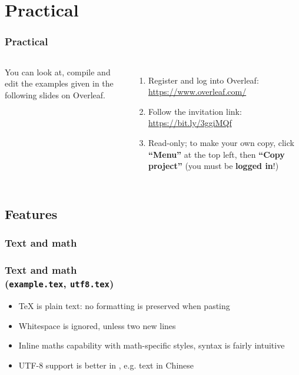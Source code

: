 \documentclass[xetex,colorlinks]{beamer} %
\begin{document}
  \section{Practical}
  \begin{frame}
    \frametitle{Practical}
    \begin{columns}
      You can look at, compile and edit the examples given in the following slides on Overleaf.
      \begin{enumerate}
      \item Register and log into Overleaf: \href{https://www.overleaf.com/}{https://www.overleaf.com/}
      \item Follow the invitation link: \href{https://www.overleaf.com/read/bghdyvmrkpdz}{https://bit.ly/3ggiMQf}
      \item Read-only; to make your own copy, click \textbf{``Menu''} at the top left, then \textbf{``Copy project''} (you must be \textbf{logged in}!)
      \end{enumerate}
    \end{columns}
  \end{frame}

  
  \subsection{Features}
  \subsubsection{Text and math}
  \begin{frame}
    \frametitle{Text and math \\ (\texttt{example.tex}, \texttt{utf8.tex})}
    \begin{itemize}
     \item \TeX{} is plain text: no formatting is preserved when pasting
     \item Whitespace is ignored, unless two new lines
     \item Inline maths capability with math-specific styles, syntax is fairly intuitive
     \item UTF-8 support is better in , e.g. text in Chinese
    \end{itemize}
  \end{frame}
  
\end{document}
